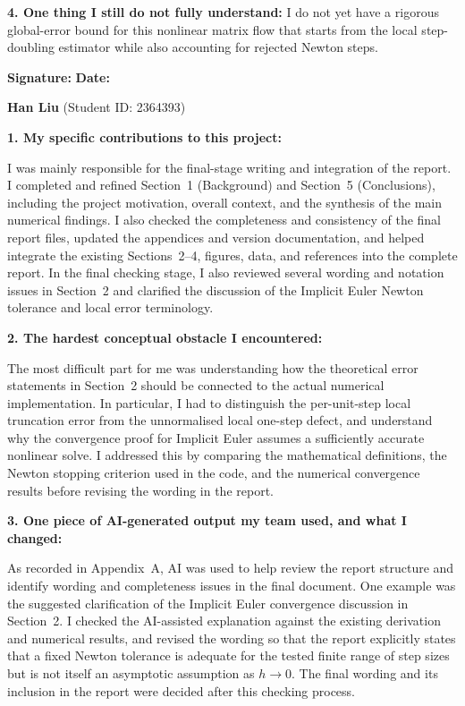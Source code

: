 \begin{formbox}
\textbf{4. One thing I still do not fully understand:} I do not yet have a
rigorous global-error bound for this nonlinear matrix flow that starts from the
local step-doubling estimator while also accounting for rejected Newton steps.

\vfill
\textbf{Signature:} \underline{\hspace{4.5cm}} \hfill
\textbf{Date:} \underline{\hspace{2.5cm}}
\end{formbox}
\clearpage
\begin{formbox}
\textbf{Han Liu} (Student ID: 2364393)
\par
\begingroup\small
\setlength{\parskip}{0.2em}

\textbf{1. My specific contributions to this project:}

I was mainly responsible for the final-stage writing and integration of the
report. I completed and refined Section~1 (Background) and Section~5
(Conclusions), including the project motivation, overall context, and the
synthesis of the main numerical findings. I also checked the completeness and
consistency of the final report files, updated the appendices and version
documentation, and helped integrate the existing Sections~2--4, figures, data,
and references into the complete report. In the final checking stage, I also
reviewed several wording and notation issues in Section~2 and clarified the
discussion of the Implicit Euler Newton tolerance and local error terminology.

\vspace{0.2em}
\textbf{2. The hardest conceptual obstacle I encountered:}

The most difficult part for me was understanding how the theoretical error
statements in Section~2 should be connected to the actual numerical
implementation. In particular, I had to distinguish the per-unit-step local
truncation error from the unnormalised local one-step defect, and understand
why the convergence proof for Implicit Euler assumes a sufficiently accurate
nonlinear solve. I addressed this by comparing the mathematical definitions,
the Newton stopping criterion used in the code, and the numerical convergence
results before revising the wording in the report.

\vspace{0.2em}
\textbf{3. One piece of AI-generated output my team used, and what I changed:}

As recorded in Appendix~A, AI was used to help review the report structure and
identify wording and completeness issues in the final document. One example was
the suggested clarification of the Implicit Euler convergence discussion in
Section~2. I checked the AI-assisted explanation against the existing
derivation and numerical results, and revised the wording so that the report
explicitly states that a fixed Newton tolerance is adequate for the tested
finite range of step sizes but is not itself an asymptotic assumption as
$h\to0$. The final wording and its inclusion in the report were decided after
this checking process.


\end{formbox}
